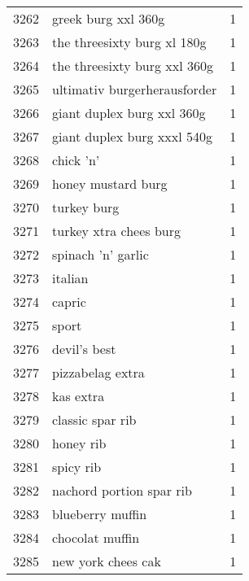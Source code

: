\begin{tabular}{llr}
3262 &                                greek burg xxl 360g &      1 \\
3263 &                        the threesixty burg xl 180g &      1 \\
3264 &                       the threesixty burg xxl 360g &      1 \\
3265 &                       ultimativ burgerherausforder &      1 \\
3266 &                         giant duplex burg xxl 360g &      1 \\
3267 &                        giant duplex burg xxxl 540g &      1 \\
3268 &                                          chick ’n’ &      1 \\
3269 &                                 honey mustard burg &      1 \\
3270 &                                        turkey burg &      1 \\
3271 &                             turkey xtra chees burg &      1 \\
3272 &                                 spinach ’n’ garlic &      1 \\
3273 &                                            italian &      1 \\
3274 &                                             capric &      1 \\
3275 &                                              sport &      1 \\
3276 &                                       devil’s best &      1 \\
3277 &                                   pizzabelag extra &      1 \\
3278 &                                          kas extra &      1 \\
3279 &                                   classic spar rib &      1 \\
3280 &                                          honey rib &      1 \\
3281 &                                          spicy rib &      1 \\
3282 &                           nachord portion spar rib &      1 \\
3283 &                                   blueberry muffin &      1 \\
3284 &                                    chocolat muffin &      1 \\
3285 &                                 new york chees cak &      1 \\

\end{tabular}
